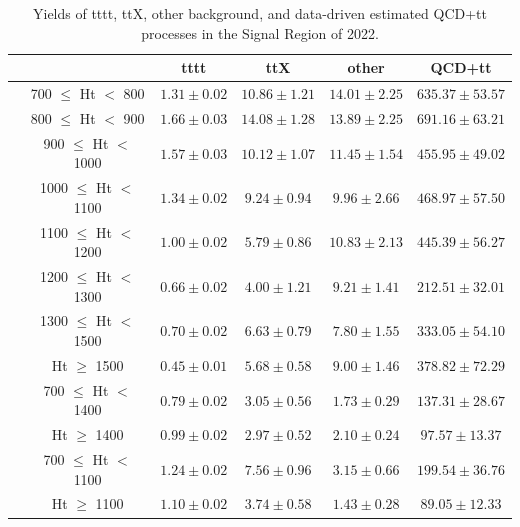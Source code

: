 \documentclass[twoside]{article}
\begin{document}
\begin{table}[h!]
\centering
\begin{adjustbox}{width=\textwidth}
\begin{tabular}{>{\raggedright\arraybackslash}p{3cm}ccccc}
\toprule
 & & \textbf{tttt} & \textbf{ttX} & \textbf{other} & \textbf{QCD+tt} \\
\midrule
\multirow{8}{*}{$N_{RT}=1, N_{BT}=0$} 
 & 700 $\leq$ Ht $<$ 800 & $1.31 \pm 0.02$ & $10.86 \pm 1.21$ & $14.01 \pm 2.25$ & $635.37 \pm 53.57$ \\
 & 800 $\leq$ Ht $<$ 900 & $1.66 \pm 0.03$ & $14.08 \pm 1.28$ & $13.89 \pm 2.25$ & $691.16 \pm 63.21$ \\
 & 900 $\leq$ Ht $<$ 1000 & $1.57 \pm 0.03$ & $10.12 \pm 1.07$ & $11.45 \pm 1.54$ & $455.95 \pm 49.02$ \\
 & 1000 $\leq$ Ht $<$ 1100 & $1.34 \pm 0.02$ & $9.24 \pm 0.94$ & $9.96 \pm 2.66$ & $468.97 \pm 57.50$ \\
 & 1100 $\leq$ Ht $<$ 1200 & $1.00 \pm 0.02$ & $5.79 \pm 0.86$ & $10.83 \pm 2.13$ & $445.39 \pm 56.27$ \\
 & 1200 $\leq$ Ht $<$ 1300 & $0.66 \pm 0.02$ & $4.00 \pm 1.21$ & $9.21 \pm 1.41$ & $212.51 \pm 32.01$ \\
 & 1300 $\leq$ Ht $<$ 1500 & $0.70 \pm 0.02$ & $6.63 \pm 0.79$ & $7.80 \pm 1.55$ & $333.05 \pm 54.10$ \\
 & Ht $\geq$ 1500 & $0.45 \pm 0.01$ & $5.68 \pm 0.58$ & $9.00 \pm 1.46$ & $378.82 \pm 72.29$ \\
\midrule
\multirow{2}{*}{$N_{RT}=1, N_{BT}\geq1$} 
 & 700 $\leq$ Ht $<$ 1400 & $0.79 \pm 0.02$ & $3.05 \pm 0.56$ & $1.73 \pm 0.29$ & $137.31 \pm 28.67$ \\
 & Ht $\geq$ 1400 & $0.99 \pm 0.02$ & $2.97 \pm 0.52$ & $2.10 \pm 0.24$ & $97.57 \pm 13.37$ \\
\midrule
\multirow{2}{*}{$N_{RT}\geq2$} 
 & 700 $\leq$ Ht $<$ 1100 & $1.24 \pm 0.02$ & $7.56 \pm 0.96$ & $3.15 \pm 0.66$ & $199.54 \pm 36.76$ \\
 & Ht $\geq$ 1100 & $1.10 \pm 0.02$ & $3.74 \pm 0.58$ & $1.43 \pm 0.28$ & $89.05 \pm 12.33$ \\
\bottomrule
\end{tabular}
\end{adjustbox}
\caption{Yields of tttt, ttX, other background, and data-driven estimated QCD+tt processes in the Signal Region of 2022.}
\label{fig:yield2022}
\end{table}
\end{document}
